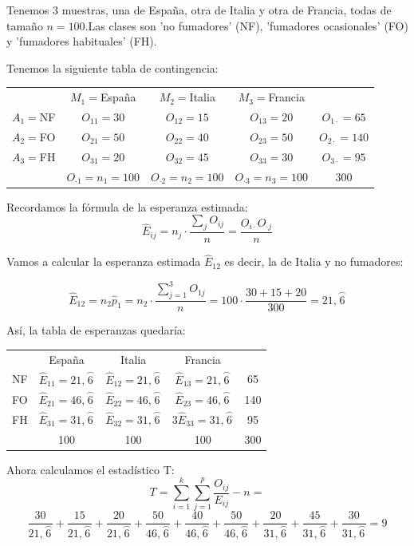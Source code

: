 \documentclass[nochap]{apuntes}
\begin{document}
\begin{example}
Tenemos 3 muestras, una de España, otra de Italia y otra de Francia, todas de tamaño $n=100$.Las clases son 'no fumadores' (NF), 'fumadores ocasionales' (FO) y 'fumadores habituales' (FH).

Tenemos la siguiente tabla de contingencia:

\begin{tabular}{ccccc}
& $M_1=$España & $M_2=$Italia & $M_3=$Francia & \\
$A_1=$NF & $O_{11}=30$ & $O_{12}=15$ & $O_{13}=20$ & $O_{1\cdot}=65$ \\
$A_2=$FO & $O_{21}=50$ & $O_{22}=40$ & $O_{23}=50$ & $O_{2\cdot}=140$ \\
$A_3=$FH & $O_{31}=20$ & $O_{32}=45$ & $O_{33}=30$ & $O_{3\cdot}=95$ \\
& $O_{\cdot1}=n_1=100$ & $O_{\cdot2}=n_2=100$ & $O_{\cdot3}=n_3=100$ & 300 \\
\end{tabular}

Recordamos la fórmula de la esperanza estimada:
$$\hat{E}_{ij} = n_j \cdot \frac{\sum_j O_{ij}}{n} = \frac{O_{i\cdot} O_{\cdot j}}{n}$$

Vamos a calcular la esperanza estimada $\hat{E}_{12}$ es decir, la de Italia y no fumadores:

$$\hat{E}_{12} = n_2 \hat{p}_1 = n_2 \cdot \frac{\sum_{j=1}^3 O_{1j}}{n} = 100 \cdot \frac{30+15+20}{300} = 21,\stackrel{\frown}{6}$$

Así, la tabla de esperanzas quedaría:

\begin{tabular}{ccccc}
& España & Italia & Francia & \\
NF & $\hat{E}_{11}=21,\stackrel{\frown}{6}$ & $\hat{E}_{12}=21,\stackrel{\frown}{6}$ & $\hat{E}_{13}=21,\stackrel{\frown}{6}$ & 65 \\
FO & $\hat{E}_{21}=46,\stackrel{\frown}{6}$ & $\hat{E}_{22}=46,\stackrel{\frown}{6}$ & $\hat{E}_{23}=46,\stackrel{\frown}{6}$ & 140 \\
FH & $\hat{E}_{31}=31,\stackrel{\frown}{6}$ & $\hat{E}_{32}=31,\stackrel{\frown}{6}$ & $3\hat{E}_{33}=31,\stackrel{\frown}{6}$ & 95 \\
& 100 & 100 & 100 & 300 \\
\end{tabular}

Ahora calculamos el estadístico T:
$$ T = \sum_{i=1}^k \sum_{j=1}^p \frac{O_{ij}}{E_{ij}}-n = $$
$$\frac{30}{21,\stackrel{\frown}{6}} + \frac{15}{21,\stackrel{\frown}{6}} + \frac{20}{21,\stackrel{\frown}{6}} + \frac{50}{46,\stackrel{\frown}{6}} + \frac{40}{46,\stackrel{\frown}{6}} +
\frac{50}{46,\stackrel{\frown}{6}} +
\frac{20}{31,\stackrel{\frown}{6}} +
\frac{45}{31,\stackrel{\frown}{6}} +
\frac{30}{31,\stackrel{\frown}{6}} = 9$$


\end{example}
\end{document}
